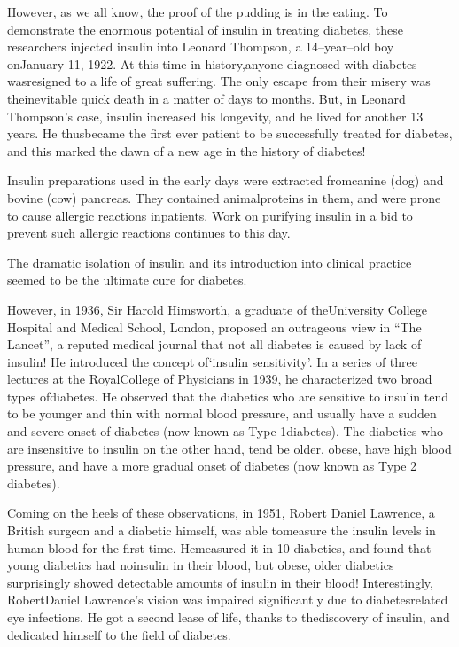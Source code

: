 However, as we all know, the proof of the pudding is in the eating. To demonstrate the enormous potential of insulin in treating diabetes, these researchers inje\-cted insulin into Leonard Thompson, a 14–year–old boy on\break January 11, 1922. At this time in history,\break anyone diagnosed with diabetes was\break resigned to a life of great suffering. The only es\-cape from their misery was the\break inevitable quick death in a matter of days to months. But, in Leonard Thompson’s case, insulin increased his longevity, and he lived for another 13 years. He thus\break became the first ever patient to be successfully treated for diabetes, and this marked the dawn of a new age in the history of diabetes!

Insulin preparations used in the early days were extracted from\break canine (dog) and bovine (cow) pancreas. They contained animal\break proteins in them, and were prone to cause allergic rea\-ctions in\break patients. Work on purifying insulin in a bid to prevent such allergic reactions continues to this day.

The dramatic isolation of insulin and its introduction into clinical practice seemed to be the ultimate cure for diabetes.

However, in 1936, Sir Harold Himsworth, a graduate of the\break University College Hospital and Medical School, London, proposed an outrageous view in “The Lancet”, a reputed medical journal that not all diabetes is caused by lack of insulin! He introduced the concept of\break ‘insulin sensitivity’. In a series of three lectures at the Royal\break College of Physicians in 1939, he characte\-rized two broad types of\break diabetes. He observed that the diabe\-tics who are sensitive to insulin tend to be younger and thin with normal blood pressure, and usually have a sudden and severe onset of diabetes (now known as Type 1\break diabetes). The diabetics who are insensitive to insulin on the other hand, tend be older, obese, have high blood pressure, and have a more gradual onset of diabetes (now known as Type 2 diabetes).

Coming on the heels of these observations, in 1951, Robert Daniel Lawrence, a British surgeon and a diabetic himself, was able to\break measure the insulin levels in human blood for the first time. He\break measured it in 10 diabetics, and found that young dia\-betics had no\break insulin in their blood, but obese, older diabetics surprisingly showed detectable amounts of insulin in their blood! Interestingly, Robert\break Daniel Lawre\-nce’s vision was impaired significantly due to diabetes\break related eye infections. He got a second lease of life, thanks to the\break discovery of insulin, and dedicated himself to the field of diabetes.

